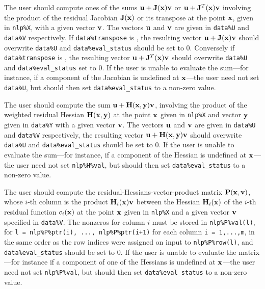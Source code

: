 \documentclass{galahad}
\begin{document}
\begin{description}
 The user should compute ones of the sums ${\mathbf{u}} + {\mathbf{J}}({\mathbf{x}}) {\mathbf{v}}$
     or ${\mathbf{u}} + {\mathbf{J}}^T({\mathbf{x}}) {\mathbf{v}}$ involving the product of the residual
     Jacobian ${\mathbf{J}}({\mathbf{x}})$ or its transpose at the point ${\mathbf{x}}$, given
     in {\tt nlp\%X}, with a given vector ${\mathbf{v}}$.
     The vectors ${\mathbf{u}}$ and ${\mathbf{v}}$ are given in {\tt data\%U}
     and {\tt data\%V} respectively.
     If {\tt data\%transpose} is \false, the resulting
     vector ${\mathbf{u}} + {\mathbf{J}}({\mathbf{x}}) {\mathbf{v}}$ should overwrite {\tt data\%U}
     and  {\tt data\%eval\_status} should be set to 0.
     Conversely if {\tt data\%transpose} is \true, the resulting
     vector ${\mathbf{u}} + {\mathbf{J}}^T({\mathbf{x}}) {\mathbf{v}}$ should overwrite {\tt data\%U}
     and {\tt data\%eval\_status} set to 0. If the user is
     unable to evaluate the sum---for instance, if a component of the Jacobian
     is undefined at ${\mathbf{x}}$---the user need not set {\tt data\%U}, but
     should then set {\tt data\%eval\_status} to a non-zero value.

 The user should compute the sum ${\mathbf{u}} + {\mathbf{H}}({\mathbf{x}},{\mathbf{y}}) {\mathbf{v}}$,
     involving the product of the weighted residual Hessian ${\mathbf{H}}({\mathbf{x}},{\mathbf{y}})$
     at the point ${\mathbf{x}}$ given in {\tt nlp\%X} and vector ${\mathbf{y}}$ given in
     {\tt data\%Y} with a given vector ${\mathbf{v}}$.
     The vectors ${\mathbf{u}}$ and ${\mathbf{v}}$ are given in {\tt data\%U}
     and {\tt data\%V} respectively, the resulting
     vector ${\mathbf{u}} + {\mathbf{H}}({\mathbf{x}},{\mathbf{y}}) {\mathbf{v}}$ should overwrite {\tt data\%U}
     and  {\tt data\%eval\_status} should be set to 0. If the user is
     unable to evaluate the sum---for instance, if a component of the Hessian
     is undefined at ${\mathbf{x}}$---the user need not set {\tt nlp\%H\%val}, but
     should then set {\tt data\%eval\_status} to a non-zero value.

 The user should compute the residual-Hessians-vector-product
     matrix ${\mathbf{P}}({\mathbf{x}},{\mathbf{v}})$, whose $i$-th column is the product
     ${\mathbf{H}}_i({\mathbf{x}}){\mathbf{v}}$ between the Hessian ${\mathbf{H}}_i({\mathbf{x}})$ of the $i$-th
     residual function $c_i({\mathbf{x}})$ at the point ${\mathbf{x}}$ given in {\tt nlp\%X}
     and a given vector ${\mathbf{v}}$ specified in {\tt data\%V}.
     The nonzeros for column $i$ must be stored in {\tt nlp\%P\%val(l)}, for
     {\tt l = nlp\%P\%ptr(i), ...,  nlp\%P\%ptr(i+1)} for each column
     {\tt i = 1,...,m}, in the same order as the row indices were assigned
     on input to {\tt nlp\%P\%row(l)},
     and  {\tt data\%eval\_status} should be set to 0.
     If the user is unable to evaluate the matrix---for instance
     if a component of one of the Hessians is
     undefined at ${\mathbf{x}}$---the user need not set {\tt nlp\%P\%val}, but
     should then set {\tt data\%eval\_status} to a non-zero value.


\end{description}
\end{document}
